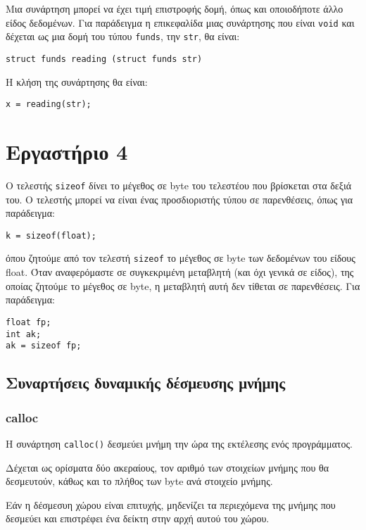 \documentclass[14pt, fleqn, leqno]{extreport}
\begin{document}
Μια συνάρτηση μπορεί να έχει τιμή επιστροφής δομή, όπως και οποιοδήποτε άλλο είδος δεδομένων. Για παράδειγμα η επικεφαλίδα μιας συνάρτησης που είναι \lstinline{void} και δέχεται ως μια δομή του τύπου \lstinline{funds}, την \lstinline{str}, θα είναι:
\begin{center}
    \lstinline{struct funds reading (struct funds str)}
\end{center}

Η κλήση της συνάρτησης θα είναι:
\begin{center}
    \lstinline{x = reading(str);}
\end{center}



\chapter{Εργαστήριο 4}

Ο τελεστής \lstinline{sizeof} δίνει το μέγεθος σε byte του τελεστέου που βρίσκεται στα δεξιά του. Ο τελεστής μπορεί να είναι ένας προσδιοριστής τύπου σε παρενθέσεις, όπως για παράδειγμα:
\begin{center}
    \lstinline{k = sizeof(float);}
\end{center}
όπου ζητούμε από τον τελεστή \lstinline{sizeof} το μέγεθος σε byte των δεδομένων του είδους float. Όταν αναφερόμαστε σε συγκεκριμένη μεταβλητή (και όχι γενικά σε είδος), της οποίας ζητούμε το μέγεθος σε byte, η μεταβλητή αυτή δεν τίθεται σε παρενθέσεις. Για παράδειγμα:
\begin{lstlisting}
float fp;
int ak;
ak = sizeof fp;
\end{lstlisting}

\section{Συναρτήσεις δυναμικής δέσμευσης μνήμης}

\subsection{calloc}

Η συνάρτηση \lstinline{calloc()} δεσμεύει μνήμη την ώρα της εκτέλεσης ενός προγράμματος.

Δέχεται ως ορίσματα δύο ακεραίους, τον αριθμό των στοιχείων μνήμης που θα δεσμευτούν, κάθως και το πλήθος των byte ανά στοιχείο μνήμης.

Εάν η δέσμεσυη χώρου είναι επιτυχής, μηδενίζει τα περιεχόμενα της μνήμης που δεσμεύει και επιστρέφει ένα δείκτη στην αρχή αυτού του χώρου.
\end{document}
